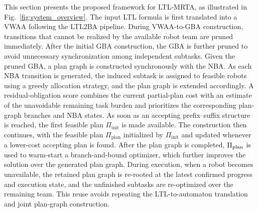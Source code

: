 \documentclass[lettersize,journal]{IEEEtran}
\theoremstyle{italiclemma}
\theoremstyle{italiclemma}
\theoremstyle{definition}
\begin{document}
This section presents the proposed framework for LTL-MRTA, as illustrated in Fig.~\ref{fig:system_overview}. 
The input LTL formula is first translated into a VWAA following the LTL2BA pipeline. During VWAA-to-GBA construction, transitions that cannot be realized by the available robot team are pruned immediately. After the initial GBA construction, the GBA is further pruned to avoid unnecessary synchronization among independent subtasks. Given the pruned GBA, a plan graph is constructed synchronously with the NBA. As each NBA transition is generated, the induced subtask is assigned to feasible robots using a greedy allocation strategy, and the plan graph is extended accordingly.  A residual-obligation score combines the current partial-plan
cost with an estimate of the unavoidable remaining task burden and prioritizes the corresponding plan-graph branches and NBA states. As soon as an accepting prefix--suffix structure is reached, the first feasible plan $\Pi_{\mathrm{init}}$ is made available. The construction then continues, with the feasible plan $\Pi_{\mathrm{plan}}$ initialized by $\Pi_{\mathrm{init}}$ and updated whenever a lower-cost accepting plan is found.
After the plan graph is completed, $\Pi_{\rm plan}$ is used to warm-start a branch-and-bound optimizer, which further improves the solution over the generated plan graph. During execution, when a robot becomes unavailable, the retained plan graph is re-rooted at the latest confirmed progress and execution state, and the unfinished subtasks are re-optimized over the remaining team. This reuse avoids repeating the LTL-to-automaton translation and joint plan-graph construction.



\end{document}
